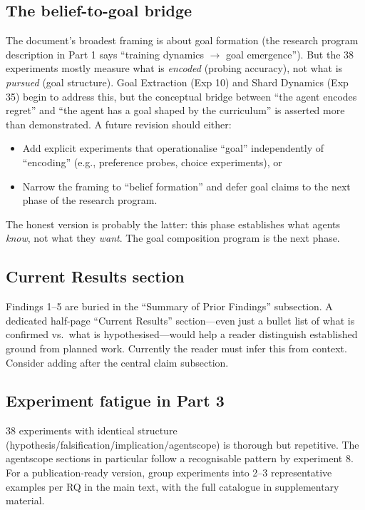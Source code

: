 \documentclass[11pt,a4paper]{article}
\theoremstyle{remark}
\begin{document}
\subsection*{The belief-to-goal bridge}
The document's broadest framing is about goal formation (the research program description in Part 1 says ``training dynamics $\to$ goal emergence''). But the 38 experiments mostly measure what is \textit{encoded} (probing accuracy), not what is \textit{pursued} (goal structure). Goal Extraction (Exp 10) and Shard Dynamics (Exp 35) begin to address this, but the conceptual bridge between ``the agent encodes regret'' and ``the agent has a goal shaped by the curriculum'' is asserted more than demonstrated. A future revision should either:
\begin{itemize}[nosep]
    \item Add explicit experiments that operationalise ``goal'' independently of ``encoding'' (e.g., preference probes, choice experiments), or
    \item Narrow the framing to ``belief formation'' and defer goal claims to the next phase of the research program.
\end{itemize}
The honest version is probably the latter: this phase establishes what agents \textit{know}, not what they \textit{want}. The goal composition program is the next phase.

\subsection*{Current Results section}
Findings 1--5 are buried in the ``Summary of Prior Findings'' subsection. A dedicated half-page ``Current Results'' section---even just a bullet list of what is confirmed vs.\ what is hypothesised---would help a reader distinguish established ground from planned work. Currently the reader must infer this from context. Consider adding after the central claim subsection.

\subsection*{Experiment fatigue in Part 3}
38 experiments with identical structure (hypothesis/falsification/implication/agentscope) is thorough but repetitive. The agentscope sections in particular follow a recognisable pattern by experiment 8. For a publication-ready version, group experiments into 2--3 representative examples per RQ in the main text, with the full catalogue in supplementary material.
\end{document}
